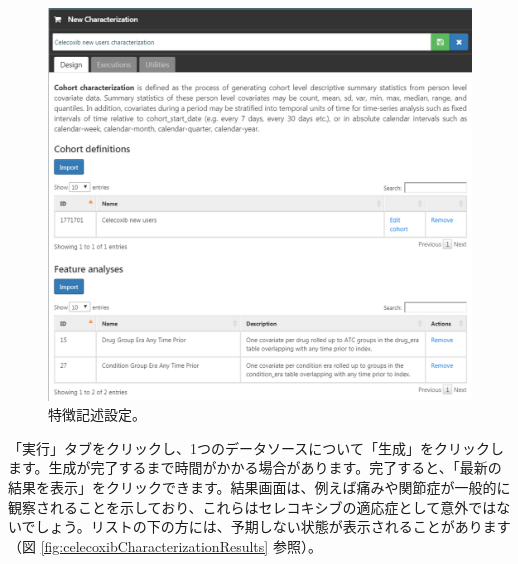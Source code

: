 \documentclass[
  11pt]{book}
\theoremstyle{definition}
\theoremstyle{definition}
\theoremstyle{definition}
\theoremstyle{definition}
\theoremstyle{remark}
\begin{document}
\begin{figure}

{\centering \includegraphics[width=1\linewidth]{images/SuggestedAnswers/celecoxibCharacterization} 

}

\caption{特徴記述設定。}\label{fig:celecoxibCharacterization}
\end{figure}

「実行」タブをクリックし、1つのデータソースについて「生成」をクリックします。生成が完了するまで時間がかかる場合があります。完了すると、「最新の結果を表示」をクリックできます。結果画面は、例えば痛みや関節症が一般的に観察されることを示しており、これらはセレコキシブの適応症として意外ではないでしょう。リストの下の方には、予期しない状態が表示されることがあります（図 \ref{fig:celecoxibCharacterizationResults} 参照）。
\end{document}
